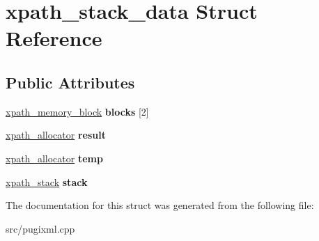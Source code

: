 \hypertarget{structxpath__stack__data}{}\section{xpath\+\_\+stack\+\_\+data Struct Reference}
\label{structxpath__stack__data}
\subsection*{Public Attributes}
\begin{DoxyCompactItemize}
\item 
\mbox{\label{structxpath__stack__data_a6821cc444dd65d997467fd3f757f4aff}} 
\hyperlink{structxpath__memory__block}{xpath\+\_\+memory\+\_\+block} {\bfseries blocks} \mbox{[}2\mbox{]}
\item 
\mbox{\label{structxpath__stack__data_ab073a685c66383ded44076993afe62d6}} 
\hyperlink{classxpath__allocator}{xpath\+\_\+allocator} {\bfseries result}
\item 
\mbox{\label{structxpath__stack__data_a56e6bb486d52f4c5c2d02370e1b41058}} 
\hyperlink{classxpath__allocator}{xpath\+\_\+allocator} {\bfseries temp}
\item 
\mbox{\label{structxpath__stack__data_ad26a92328f9aaf83fa62cb6695dbee90}} 
\hyperlink{structxpath__stack}{xpath\+\_\+stack} {\bfseries stack}
\end{DoxyCompactItemize}


The documentation for this struct was generated from the following file\+:\begin{DoxyCompactItemize}
\item 
src/pugixml.\+cpp\end{DoxyCompactItemize}
